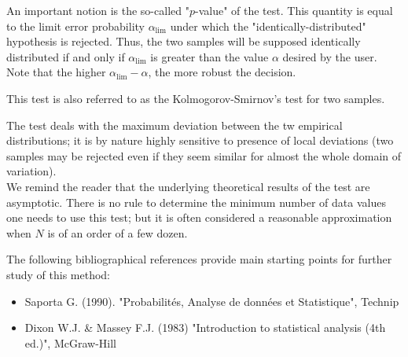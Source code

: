 {  An important notion is the so-called "$p$-value" of the test. This quantity is equal to the limit error probability $\alpha_\textrm{lim}$ under which the "identically-distributed" hypothesis is rejected. Thus, the two samples will be supposed identically distributed if and only if $\alpha_\textrm{lim}$ is greater than the value $\alpha$ desired by the user. Note that the higher $\alpha_\textrm{lim} - \alpha$, the more robust the decision.

  \vspace{2mm}
}
{
  This test is also referred to as the Kolmogorov-Smirnov's test for two samples.
}

            {
              The test deals with the maximum deviation between the tw empirical distributions; it is by nature highly sensitive to presence of local deviations (two samples may be rejected even if they seem similar for almost the whole domain of variation).\\

              We remind the reader that the underlying theoretical results of the test are asymptotic. There is no rule to determine the minimum number of data values one needs to use this test; but it is often considered a reasonable approximation when $N$ is of an order of a few dozen.

              The following bibliographical references provide main starting points for further study of this method:
              \begin{itemize}
              \item Saporta G. (1990). "Probabilités, Analyse de données et Statistique", Technip
              \item Dixon W.J. \& Massey F.J. (1983) "Introduction to statistical analysis (4th ed.)", McGraw-Hill
              \end{itemize}
            }
